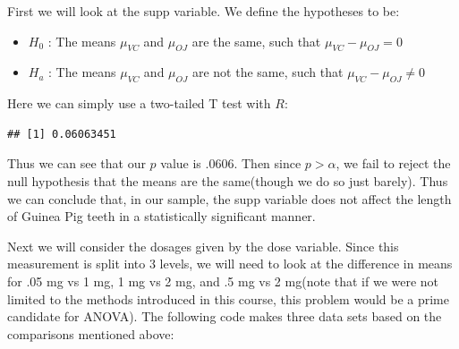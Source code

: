 \documentclass[]{article}
\newenvironment{Shaded}{\begin{snugshade}}{\end{snugshade}}
\newcommand{\KeywordTok}[1]{\textcolor[rgb]{0.13,0.29,0.53}{\textbf{{#1}}}}
\newcommand{\DataTypeTok}[1]{\textcolor[rgb]{0.13,0.29,0.53}{{#1}}}
\newcommand{\DecValTok}[1]{\textcolor[rgb]{0.00,0.00,0.81}{{#1}}}
\newcommand{\StringTok}[1]{\textcolor[rgb]{0.31,0.60,0.02}{{#1}}}
\newcommand{\NormalTok}[1]{{#1}}
\begin{document}
First we will look at the supp variable. We define the hypotheses to be:

\begin{itemize}
\item $H_0$ : The means $\mu_{VC}$ and $\mu_{OJ}$ are the same, such that $\mu_{VC} - \mu_{OJ} = 0$
\item $H_a$ : The means $\mu_{VC}$ and $\mu_{OJ}$ are not the same, such that $\mu_{VC} - \mu_{OJ} \neq 0$
\end{itemize}

Here we can simply use a two-tailed T test with \(R\):

\begin{Shaded}
\end{Shaded}

\begin{verbatim}
## [1] 0.06063451
\end{verbatim}

Thus we can see that our \(p\) value is .0606. Then since
\(p > \alpha\), we fail to reject the null hypothesis that the means are
the same(though we do so just barely). Thus we can conclude that, in our
sample, the supp variable does not affect the length of Guinea Pig teeth
in a statistically significant manner.

Next we will consider the dosages given by the dose variable. Since this
measurement is split into 3 levels, we will need to look at the
difference in means for .05 mg vs 1 mg, 1 mg vs 2 mg, and .5 mg vs 2
mg(note that if we were not limited to the methods introduced in this
course, this problem would be a prime candidate for ANOVA). The
following code makes three data sets based on the comparisons mentioned
above:

\begin{Shaded}
\end{Shaded}
\end{document}
